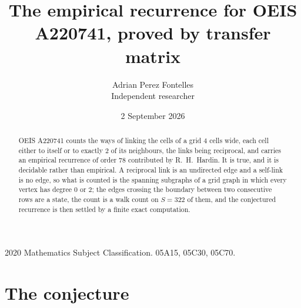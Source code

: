 \documentclass[11pt,a4paper]{article}
\title{The empirical recurrence for OEIS A220741, proved by transfer matrix}
\author{Adrian Perez Fontelles\\ \small Independent researcher}
\date{2 September 2026}
\theoremstyle{plain}
\theoremstyle{definition}
\begin{document}
\maketitle

\begin{abstract}
OEIS A220741 counts the ways of linking the cells of a grid $4$ cells wide, each cell either to
itself or to exactly $2$ of its neighbours, the links being reciprocal, and carries an
empirical recurrence of order $78$ contributed by R.~H.~Hardin. It is true, and it is
decidable rather than empirical. A reciprocal link is an undirected edge and a self-link is
no edge, so what is counted is the spanning subgraphs of a grid graph in which every vertex
has degree $0$ or $2$; the edges crossing the boundary between two consecutive rows are a
state, the count is a walk count on $S=322$ of them, and the conjectured recurrence is then
settled by a finite exact computation.
\end{abstract}

\noindent\small 2020 Mathematics Subject Classification. 05A15, 05C30, 05C70.\normalsize

\section{The conjecture}
\end{document}
